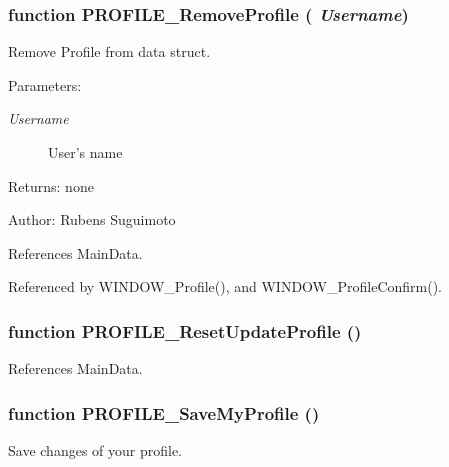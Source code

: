 \subsubsection[PROFILE\_\-RemoveProfile]{\setlength{\rightskip}{0pt plus 5cm}function PROFILE\_\-RemoveProfile ( {\em Username})}\label{profile_2profile_8js_70701a1a004da0bac2f7336972f00aa1}


Remove Profile from data struct. 

\begin{Desc}
\item[Parameters:]
\begin{description}
\item[{\em Username}]User's name \end{description}
\end{Desc}
\begin{Desc}
\item[Returns:]none \end{Desc}
\begin{Desc}
\item[Author:]Rubens Suguimoto \end{Desc}


References MainData.

Referenced by WINDOW\_\-Profile(), and WINDOW\_\-ProfileConfirm().
\subsubsection[PROFILE\_\-ResetUpdateProfile]{\setlength{\rightskip}{0pt plus 5cm}function PROFILE\_\-ResetUpdateProfile ()}\label{profile_2profile_8js_a69a85d3505652beabca2518da65ba77}




References MainData.
\subsubsection[PROFILE\_\-SaveMyProfile]{\setlength{\rightskip}{0pt plus 5cm}function PROFILE\_\-SaveMyProfile ()}\label{profile_2profile_8js_685d222531076f6d4b69e72299b5c8d9}


Save changes of your profile. 

